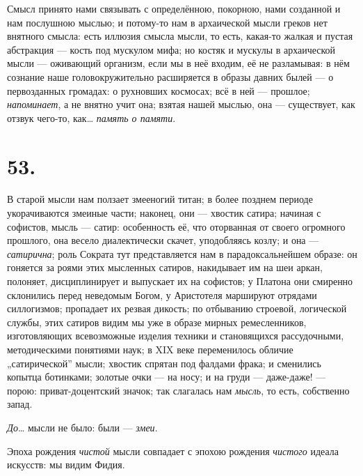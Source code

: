 \documentclass[12pt,a4paper,oneside]{book}
\begin{document}
Смысл принято нами связывать с определённою, покорною, нами созданной и нам послушною мыслью; и потому-то нам в архаической мысли греков нет внятного смысла: есть иллюзия смысла мысли, то есть, какая-то жалкая и пустая абстракция — кость под мускулом мифа; но костяк и мускулы в архаической мысли — оживающий организм, если мы в неё входим, её не разламывая: в нём сознание наше головокружительно расширяется в образы давних былей — о первозданных громадах: о рухновших космосах; всё в ней — прошлое; \emph{напоминает}, а не внятно учит она; взятая нашей мыслью, она — существует, как отзвук чего-то, как… \emph{память о памяти}.

\section*{53.}

В старой мысли нам ползает змееногий титан; в более позднем периоде укорачиваются змеиные части; наконец, они — хвостик сатира; начиная с софистов, мысль — сатир: особенность её, что оторванная от своего огромного прошлого, она весело диалектически скачет, уподобляясь козлу; и она — \emph{сатирична}; роль Сократа тут представляется нам в парадоксальнейшем образе: он гоняется за роями этих мысленных сатиров, накидывает им на шеи аркан, полоняет, дисциплинирует и выпускает их на софистов; у Платона они смиренно склонились перед неведомым Богом, у Аристотеля маршируют отрядами силлогизмов; пропадает их резвая дикость; по отбыванию строевой, логической службы, этих сатиров видим мы уже в образе мирных ремесленников, изготовляющих всевозможные изделия техники и становящихся рассудочными, методическими понятиями наук; в XIX веке переменилось обличие „сатирической” мысли; хвостик спрятан под фалдами фрака; и сменились копытца ботинками; золотые очки — на носу; и на груди — даже-даже! — порою: приват-доцентский значок; так слагалась нам \emph{мысль}, то есть, собственно запад.

\emph{До}… мысли не было: были — \emph{змеи}.

Эпоха рождения \emph{чистой} мысли совпадает с эпохою рождения \emph{чистого} идеала искусств: мы видим Фидия.
\end{document}
